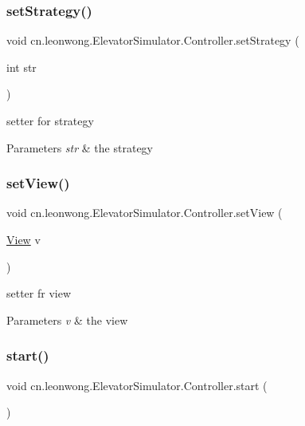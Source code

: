 \subsubsection{\texorpdfstring{set\+Strategy()}{setStrategy()}}
{\footnotesize\ttfamily void cn.\+leonwong.\+Elevator\+Simulator.\+Controller.\+set\+Strategy (\begin{DoxyParamCaption}\item[{int}]{str }\end{DoxyParamCaption})}

setter for strategy 
\begin{DoxyParams}{Parameters}
{\em str} & the strategy \\
\hline
\end{DoxyParams}
\mbox{\label{classcn_1_1leonwong_1_1_elevator_simulator_1_1_controller_a38c35c44135e435c2dc662685f119658}} 
\subsubsection{\texorpdfstring{set\+View()}{setView()}}
{\footnotesize\ttfamily void cn.\+leonwong.\+Elevator\+Simulator.\+Controller.\+set\+View (\begin{DoxyParamCaption}\item[{\hyperlink{classcn_1_1leonwong_1_1_elevator_simulator_1_1_view}{View}}]{v }\end{DoxyParamCaption})}

setter fr view 
\begin{DoxyParams}{Parameters}
{\em v} & the view \\
\hline
\end{DoxyParams}
\mbox{\label{classcn_1_1leonwong_1_1_elevator_simulator_1_1_controller_a65d8fff6b66fa289ce724caf6df177ab}} 
\subsubsection{\texorpdfstring{start()}{start()}}
{\footnotesize\ttfamily void cn.\+leonwong.\+Elevator\+Simulator.\+Controller.\+start (\begin{DoxyParamCaption}{ }\end{DoxyParamCaption})}

